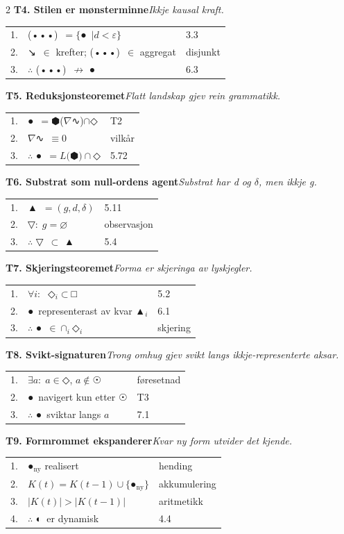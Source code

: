 \documentclass[a4paper,10pt]{article}
\makeatletter
\newcommand{\g}[1]{{\symbolfont #1}}
\newcommand{\gAgent}{\g{▲}}
\newcommand{\gForm}{\g{●}}
\newcommand{\gGrammatikk}{\g{⬢}}
\newcommand{\gFormrom}{\g{□}}
\newcommand{\gLyskjegle}{\g{◇}}
\newcommand{\gOmhug}{\g{☉}}
\newcommand{\gPartisjon}{\g{◐}}
\newcommand{\gTrykk}{\g{↘}}
\newcommand{\gStilart}{\g{(•••)}}
\newcommand{\gSubstrat}{\g{▽}}
\newcommand{\gLandskap}{\g{∿}}
\newcommand{\bv}[3]{%
\vspace{0.4em}%
\noindent\textbf{#1}\hspace{0.4em}\emph{\footnotesize #2}\\[0.15em]
\begin{tabular}{@{}r@{\hspace{0.3em}}l@{\hspace{0.8em}}l@{}}
#3
\end{tabular}%
}
\makeatother
\begin{document}
\begin{multicols}{2}
\bv{T4. Stilen er mønsterminne}{Ikkje kausal kraft.}{%
1. & \gStilart\ $=\{$\gForm\ $\mid d<\varepsilon\}$                            & 3.3\\
2. & \gTrykk\ $\in$ krefter; \gStilart\ $\in$ aggregat                         & disjunkt\\
3. & $\therefore$ \gStilart\ $\not\rightarrow$ \gForm                          & 6.3\\
}

\bv{T5. Reduksjonsteoremet}{Flatt landskap gjev rein grammatikk.}{%
1. & \gForm\ $=$\gGrammatikk($\nabla$\gLandskap)$\cap$\gLyskjegle               & T2\\
2. & $\nabla$\gLandskap\ $\equiv 0$                                            & vilk\aa{}r\\
3. & $\therefore$ \gForm\ $=L($\gGrammatikk$)\cap$\gLyskjegle                   & 5.72\\
}

\bv{T6. Substrat som null-ordens agent}{Substrat har d og $\delta$, men ikkje g.}{%
1. & \gAgent\ $=(g,d,\delta)$                                                  & 5.11\\
2. & \gSubstrat$:\; g=\varnothing$                                             & observasjon\\
3. & $\therefore$ \gSubstrat\ $\subset$ \gAgent                                & 5.4\\
}

\columnbreak

\bv{T7. Skjeringsteoremet}{Forma er skjeringa av lyskjegler.}{%
1. & $\forall i:\;$ \gLyskjegle$_i\subset$\gFormrom                            & 5.2\\
2. & \gForm\ representerast av kvar \gAgent$_i$                                & 6.1\\
3. & $\therefore$ \gForm\ $\in\cap_i$\gLyskjegle$_i$                           & skjering\\
}

\bv{T8. Svikt-signaturen}{Trong omhug gjev svikt langs ikkje-representerte aksar.}{%
1. & $\exists a:\; a\in$\gLyskjegle, $a\notin$\gOmhug                          & f\o{}resetnad\\
2. & \gForm\ navigert kun etter \gOmhug                                        & T3\\
3. & $\therefore$ \gForm\ sviktar langs $a$                                    & 7.1\\
}

\bv{T9. Formrommet ekspanderer}{Kvar ny form utvider det kjende.}{%
1. & \gForm$_{\text{ny}}$ realisert                                            & hending\\
2. & $K(t)=K(t{-}1)\cup\{$\gForm$_{\text{ny}}\}$                               & akkumulering\\
3. & $|K(t)|>|K(t{-}1)|$                                                       & aritmetikk\\
4. & $\therefore$ \gPartisjon\ er dynamisk                                     & 4.4\\
}


\end{multicols}
\end{document}
